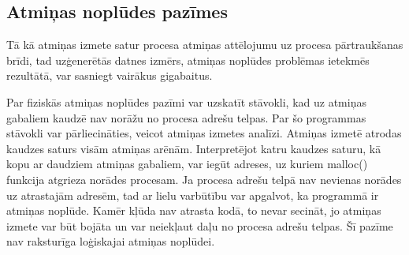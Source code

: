 ﻿




\subsection{Atmiņas noplūdes pazīmes}


Tā kā atmiņas izmete satur procesa atmiņas attēlojumu uz procesa pārtraukšanas brīdi, tad uzģenerētās datnes izmērs, atmiņas noplūdes problēmas ietekmēs rezultātā, var sasniegt vairākus gigabaitus.


Par fiziskās atmiņas noplūdes pazīmi var uzskatīt stāvokli, kad uz atmiņas gabaliem kaudzē nav norāžu no procesa adrešu telpas.
Par šo programmas stāvokli var pārliecināties, veicot atmiņas izmetes analīzi. 
Atmiņas izmetē atrodas kaudzes saturs visām atmiņas arēnām. 
Interpretējot katru kaudzes saturu, kā kopu ar daudziem atmiņas gabaliem, var iegūt adreses, uz kuriem malloc() funkcija atgrieza norādes procesam.
Ja procesa adrešu telpā nav nevienas norādes uz atrastajām adresēm, tad ar lielu varbūtību var apgalvot, ka programmā ir atmiņas noplūde.
Kamēr kļūda nav atrasta kodā, to nevar secināt, jo atmiņas izmete var būt bojāta un var neiekļaut daļu no procesa adrešu telpas.
Šī pazīme nav raksturīga loģiskajai atmiņas noplūdei.



